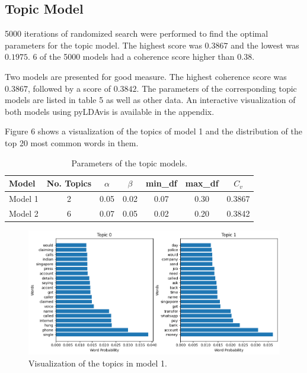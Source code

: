 \subsection{Topic Model}

5000 iterations of randomized search were performed to find the optimal parameters for the topic model. The highest score was $0.3867$ and the lowest was $0.1975$. 6 of the 5000 models had a coherence score higher than $0.38$.

Two models are presented for good measure. The highest coherence score was $0.3867$, followed by a score of $0.3842$. The parameters of the corresponding topic models are listed in table 5 as well as other data. An interactive visualization of both models using pyLDAvis is available in the appendix.

Figure 6 shows a visualization of the topics of model 1 and the distribution of the top 20 most common words in them.

\begin{table}[!h]
    \centering
    \begin{tabular}[\textwidth]{lcccccc}
        \hline
        \textbf{Model}  & No. Topics & $\alpha$ & $\beta$ & min\_df & max\_df & $C_v$ \\ \hline
        Model 1 & 2 & 0.05 & 0.02 & 0.07 & 0.30 & 0.3867 \\
        Model 2 & 6 & 0.07 & 0.05 & 0.02 & 0.20 & 0.3842 \\ \hline
    \end{tabular}
    \caption{Parameters of the topic models.}
\end{table}

\begin{figure}[H]
    \centering
    \includegraphics[width=\textwidth]{resources/model_n_2.png}
    \caption{Visualization of the topics in model 1.}
    \label{fig:topic_model_1}
\end{figure}

